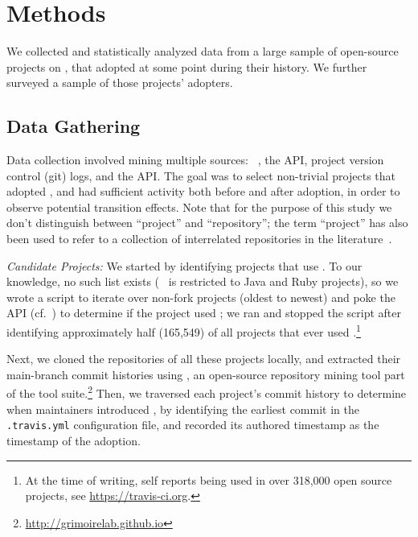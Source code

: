 
\section{Methods}
\label{sec:method}

We collected and statistically analyzed data from a large sample of open-source 
projects on \GH, that adopted \Tvis at some point during their history.
We further surveyed a sample of those projects' \Tvis adopters.

\subsection{Data Gathering}

Data collection involved mining multiple sources: \GHT~\cite{gousios2012ghtorrent}, 
the \GH API, project version control (git) logs, and the \Tvis API.
The goal was to select non-trivial projects that adopted \Tvis, and had sufficient
activity both before and after adoption, in order to observe potential transition effects.
Note that for the purpose of this study we don't distinguish between ``project'' 
and ``repository''; the term ``project'' has also been used to refer to a collection 
of interrelated repositories in the literature~\cite{vasilescu2016sky}.

\smallskip\noindent\emph{Candidate Projects:} 
We started by identifying \GH projects that use \Tvi.
To our knowledge, no such list exists 
(\TT~\cite{beller2017travistorrent} is restricted to Java and Ruby projects), so
we wrote a script to iterate over non-fork \GHT projects (oldest to newest)
and poke the \Tvis API (cf.\ \cite{era14}) to determine if the project used \Tvi;
we ran and stopped the script after identifying approximately half (165,549)
of all \GH projects that ever used \Tvis.\footnote{At the time of writing, \Tvi self 
reports being used in over 318,000 open source \GH projects, see 
\url{https://travis-ci.org}.} 

Next, we cloned the \GH repositories of all these projects locally, and extracted
their main-branch commit histories using \Perc, an open-source repository
mining tool part of the \GLab tool suite.\footnote{\url{http://grimoirelab.github.io}}
Then, we traversed each project's commit history to determine when 
maintainers introduced \Tvis, by identifying the earliest commit in the 
\texttt{.travis.yml} configuration file, and recorded its authored timestamp as
the timestamp of the \Tvi adoption.

